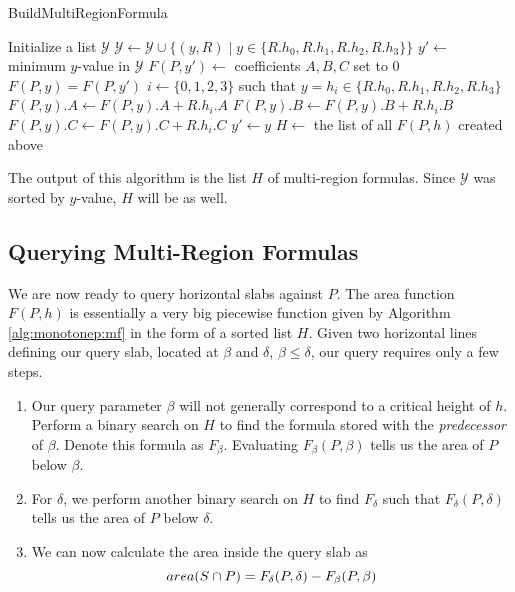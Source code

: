 \begin{algorithm}
\LinesNumbered
\DontPrintSemicolon
\caption{BuildMultiRegionFormula}
\label{alg:monotonep:mf}
\BlankLine
Initialize a list $\mathcal{Y}$\;
{
$\mathcal{Y} \gets \mathcal{Y} \cup \{ (y,R) \;|\; y \in \{R.h_0, R.h_1, R.h_2, R.h_3\}\}$\;
}
\;
\BlankLine
$y' \gets $ minimum $y$-value in $\mathcal{Y}$\;
$F(P, y') \gets $ coefficients $A,B,C$ set to 0\;
\BlankLine
{}
{
$F(P, y) = F(P, y')$\;
$i \gets \{0,1,2,3\}$ such that $y = h_i \in \{R.h_0, R.h_1, R.h_2, R.h_3\}$\;
$F(P,y).A \gets F(P,y).A + R.h_i.A$\;
$F(P,y).B \gets F(P,y).B + R.h_i.B$\;
$F(P,y).C \gets F(P,y).C + R.h_i.C$\;
\BlankLine
$y' \gets y$\;
}
\BlankLine
$H \gets $ the list of all $F(P, h)$ created above\;
\end{algorithm}

The output of this algorithm is the list $H$ of multi-region formulas. Since $\mathcal{Y}$ was sorted by $y$-value, $H$ will be as well.


\subsection{Querying Multi-Region Formulas}
\label{:monotonep:query-mf}

We are now ready to query horizontal slabs against $P$. The area function $F(P,h)$ is essentially a very big piecewise function given by Algorithm \ref{alg:monotonep:mf} in the form of a sorted list $H$. Given two horizontal lines defining our query slab, located at $\beta$ and $\delta$, $\beta \leq \delta$, our query requires only a few steps.

\begin{enumerate}
\item Our query parameter $\beta$ will not generally correspond to a critical height of $h$. Perform a binary search on $H$ to find the formula stored with the \emph{predecessor} of $\beta$. Denote this formula as $F_\beta$. Evaluating $F_\beta(P, \beta)$ tells us the area of $P$ below $\beta$.

\item For $\delta$, we perform another binary search on $H$ to find $F_\delta$ such that $F_\delta(P, \delta)$ tells us the area of $P$ below $\delta$.

\item We can now calculate the area inside the query slab as
\[ 
area(S \cap P) = F_\delta(P, \delta) - F_\beta(P, \beta)
\]

\end{enumerate}

